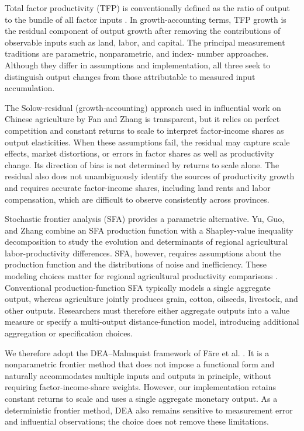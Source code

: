 \documentclass[sustainability,article,submit,moreauthors]{Definitions/mdpi}
\numberwithin{equation}{section}
\begin{document}
Total factor productivity (TFP) is conventionally defined as the ratio of
output to the bundle of all factor inputs \cite{liu1999}. In growth-accounting terms, TFP
growth is the residual component of output growth after removing the
contributions of observable inputs such as land, labor, and capital. The
principal measurement traditions are parametric, nonparametric, and index-
number approaches. Although they differ in assumptions and implementation,
all three seek to distinguish output changes from those attributable to
measured input accumulation.

The Solow-residual (growth-accounting) approach used in influential work on
Chinese agriculture by Fan and Zhang \cite{fan2002} is transparent, but it
relies on perfect competition and constant returns to scale to interpret
factor-income shares as output elasticities. When these assumptions fail,
the residual may capture scale effects, market distortions, or errors in
factor shares as well as productivity change. Its direction of bias is not
determined by returns to scale alone. The residual also does not
unambiguously identify the sources of productivity growth and requires
accurate factor-income shares, including land rents
and labor compensation, which are difficult to observe consistently across
provinces.

Stochastic frontier analysis (SFA) provides a parametric alternative. Yu,
Guo, and Zhang \cite{yu2011} combine an SFA production function with a
Shapley-value inequality decomposition to study the evolution and
determinants of regional agricultural labor-productivity differences.
SFA, however, requires assumptions about the production function and the
distributions of noise and inefficiency. These modeling choices matter for
regional agricultural productivity comparisons \cite{gao2015}. Conventional
production-function SFA typically models a single aggregate output, whereas
agriculture jointly produces grain,
cotton, oilseeds, livestock, and other outputs. Researchers must therefore
either aggregate outputs into a value measure or specify a multi-output
distance-function model, introducing additional aggregation or specification
choices.

We therefore adopt the DEA--Malmquist framework of
F\"are et al. \cite{fare1994}. It is a nonparametric frontier method that does
not impose a functional form and naturally accommodates multiple inputs and
outputs in principle, without requiring factor-income-share weights.
However, our implementation retains constant returns to scale and uses a
single aggregate monetary output. As a deterministic frontier method, DEA
also remains sensitive to measurement error and influential observations;
the choice does not remove these limitations.
\end{document}
